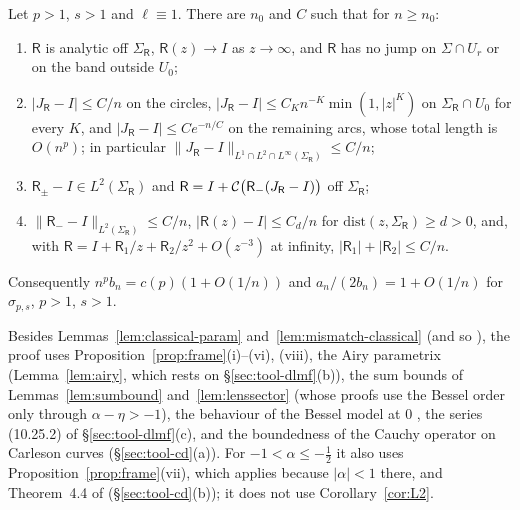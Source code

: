 \begin{proposition}\label{prop:classical}
Let $p>1$, $s>1$ and $\ell\equiv1$. There are $n_0$ and $C$ such that for $n\ge n_0$:
\begin{enumerate}
\item[(i)] $\mathsf R$ is analytic off $\Sigma_{\mathsf R}$, $\mathsf R(z)\to I$ as $z\to\infty$, and $\mathsf R$ has no jump
  on $\Sigma\cap U_r$ or on the band outside $U_0$;
\item[(ii)] $|J_{\mathsf R}-I|\le C/n$ on the circles, $|J_{\mathsf R}-I|\le C_Kn^{-K}\min(1,|z|^K)$ on $\Sigma_{\mathsf R}\cap U_0$
  for every $K$, and $|J_{\mathsf R}-I|\le Ce^{-n/C}$ on the remaining arcs, whose total length is $O(n^p)$; in particular
  $\|J_{\mathsf R}-I\|_{L^1\cap L^2\cap L^\infty(\Sigma_{\mathsf R})}\le C/n$;
\item[(iii)] $\mathsf R_\pm-I\in L^2(\Sigma_{\mathsf R})$ and $\mathsf R=I+\mathcal{C}\bigl(\mathsf R_-(J_{\mathsf R}-I)\bigr)$ off
  $\Sigma_{\mathsf R}$;
\item[(iv)] $\|\mathsf R_--I\|_{L^2(\Sigma_{\mathsf R})}\le C/n$, $|\mathsf R(z)-I|\le C_d/n$ for $\mathrm{dist}(z,\Sigma_{\mathsf R})\ge d>0$,
  and, with $\mathsf R=I+\mathsf R_1/z+\mathsf R_2/z^2+O(z^{-3})$ at infinity, $|\mathsf R_1|+|\mathsf R_2|\le C/n$.
\end{enumerate}
Consequently $n^pb_n=c(p)(1+O(1/n))$ and $a_n/(2b_n)=1+O(1/n)$ for $\sigma_{p,s}$, $p>1$, $s>1$.
\end{proposition}

Besides Lemmas~\ref{lem:classical-param} and~\ref{lem:mismatch-classical} (and so \cite[\S6]{KMVV}), the proof uses
Proposition~\ref{prop:frame}(i)--(vi), (viii), the Airy parametrix (Lemma~\ref{lem:airy}, which rests on
\S\ref{sec:tool-dlmf}(b)), the sum bounds of Lemmas~\ref{lem:sumbound} and~\ref{lem:lenssector} (whose proofs use the
Bessel order only through $\alpha-\eta>-1$), the behaviour of the Bessel model at $0$ \cite[(6.19)--(6.21)]{KMVV}, the
series (10.25.2) of \S\ref{sec:tool-dlmf}(c), and the boundedness of the Cauchy operator on Carleson curves
(\S\ref{sec:tool-cd}(a)). For $-1<\alpha\le-\frac12$ it also uses Proposition~\ref{prop:frame}(vii), which applies
because $|\alpha|<1$ there, and Theorem~4.4 of \cite{CD} (\S\ref{sec:tool-cd}(b)); it does not use
Corollary~\ref{cor:L2}.

